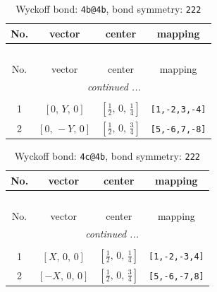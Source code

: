 \documentclass[fleqn,8pt]{jsarticle}
\begin{document}
\renewcommand{\arraystretch}{1.2}
\begin{longtable}{cccc}
\caption{Wyckoff bond: {\tt 4b@4b}, bond symmetry: {\tt 222}}
 \\
 \hline \hline
No. & vector & center & mapping \\ \hline \endfirsthead

\multicolumn{3}{l}{\tablename\ \thetable{}} \\
 \hline \hline
No. & vector & center & mapping \\ \hline \endhead

 \hline \hline
\multicolumn{3}{r}{\footnotesize\it continued ...} \\ \endfoot

 \hline \hline
\multicolumn{3}{r}{} \\ \endlastfoot

1 & $\left[ 0,\, Y,\, 0 \right]$ & $\left[ \frac{1}{2},\, 0,\, \frac{1}{4} \right]$ & {\tt [1,-2,3,-4]} \\ \hline
2 & $\left[ 0,\, - Y,\, 0 \right]$ & $\left[ \frac{1}{2},\, 0,\, \frac{3}{4} \right]$ & {\tt [5,-6,7,-8]} \\
\end{longtable}
\renewcommand{\arraystretch}{1.2}
\begin{longtable}{cccc}
\caption{Wyckoff bond: {\tt 4c@4b}, bond symmetry: {\tt 222}}
 \\
 \hline \hline
No. & vector & center & mapping \\ \hline \endfirsthead

\multicolumn{3}{l}{\tablename\ \thetable{}} \\
 \hline \hline
No. & vector & center & mapping \\ \hline \endhead

 \hline \hline
\multicolumn{3}{r}{\footnotesize\it continued ...} \\ \endfoot

 \hline \hline
\multicolumn{3}{r}{} \\ \endlastfoot

1 & $\left[ X,\, 0,\, 0 \right]$ & $\left[ \frac{1}{2},\, 0,\, \frac{1}{4} \right]$ & {\tt [1,-2,-3,4]} \\ \hline
2 & $\left[ - X,\, 0,\, 0 \right]$ & $\left[ \frac{1}{2},\, 0,\, \frac{3}{4} \right]$ & {\tt [5,-6,-7,8]} \\
\end{longtable}
\renewcommand{\arraystretch}{1.2}
\end{document}
